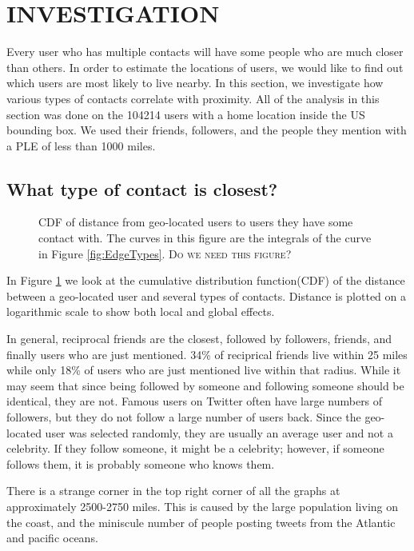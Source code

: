 \documentclass{sig-alternate}
\begin{document}
\section{INVESTIGATION}
Every user who has multiple contacts will have some people who are much
closer than others. In order to estimate the locations of users, we would like
to find out which users are most likely to live nearby.  In this section, we
investigate how various types of contacts correlate with proximity.
All of the analysis in this section was done on the 104214 users with a home
location inside the US bounding box. We used their friends, followers, and the
people they mention with a PLE of less than 1000 miles.

\subsection{What type of contact is closest?}
\begin{figure}
\centering
{}
\caption{
CDF of distance from geo-located users to users they have some contact
with.
The curves in this figure are the integrals of the curve in Figure \ref{fig:EdgeTypes}.
\textsc{Do we need this figure?}
}
\label{fig:EdgeTypesCum}
\end{figure}
In Figure \ref{fig:EdgeTypesCum} we look at the cumulative distribution
function(CDF) of the distance between a geo-located user and several types of
contacts.
Distance is plotted on a logarithmic scale to show both local and
global effects.

In general, reciprocal friends are the closest, followed by followers, friends,
and finally users who are just mentioned.
34\% of reciprical friends live within 25 miles while only 18\% of users who are
just mentioned live within that radius.
While it may seem that since being followed by someone and following someone
should be identical, they are not.
Famous users on Twitter often have large numbers of followers, but they do not
follow a large number of users back.
Since the geo-located user was selected randomly, they are usually an average
user and not a celebrity.
If they follow someone, it might be a celebrity; however, if someone follows
them, it is probably someone who knows them.

There is a strange corner in the top right corner of all the graphs at
approximately 2500-2750 miles. This is caused by the large population living on the
coast, and the miniscule number of people posting tweets from the Atlantic and
pacific oceans.
\end{document}
